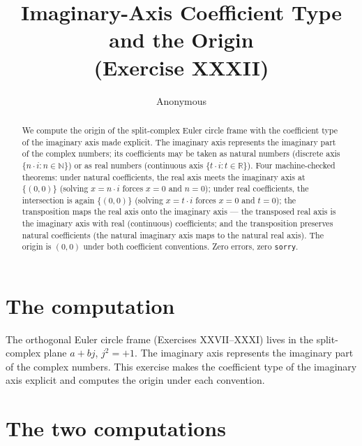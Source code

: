 \documentclass[sigplan,10pt,anonymous,review]{acmart}
\begin{document}
\title{Imaginary-Axis Coefficient Type and the Origin\\
(Exercise XXXII)}

\author{Anonymous}

\begin{abstract}
We compute the origin of the split-complex Euler circle frame with the
coefficient type of the imaginary axis made explicit. The imaginary
axis represents the imaginary part of the complex numbers; its
coefficients may be taken as natural numbers (discrete axis
$\{n \cdot i : n \in \mathbb{N}\}$) or as real numbers (continuous axis
$\{t \cdot i : t \in \mathbb{R}\}$). Four machine-checked theorems:
under natural coefficients, the real axis meets the imaginary axis at
$\{(0,0)\}$ (solving $x = n \cdot i$ forces $x = 0$ and $n = 0$);
under real coefficients, the intersection is again $\{(0,0)\}$
(solving $x = t \cdot i$ forces $x = 0$ and $t = 0$); the transposition
maps the real axis onto the imaginary axis --- the transposed real axis
is the imaginary axis with real (continuous) coefficients; and the
transposition preserves natural coefficients (the natural imaginary
axis maps to the natural real axis). The origin is $(0,0)$ under both
coefficient conventions. Zero errors, zero \texttt{sorry}.
\end{abstract}


\maketitle

\section{The computation}

The orthogonal Euler circle frame (Exercises XXVII--XXXI) lives in the
split-complex plane $a + bj$, $j^2 = +1$. The imaginary axis represents
the imaginary part of the complex numbers. This exercise makes the
coefficient type of the imaginary axis explicit and computes the origin
under each convention.

\section{The two computations}
\end{document}
